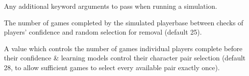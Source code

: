 \begin{description}[style=multiline,leftmargin=3cm]
  \item[kwargs] Any additional keyword arguments to pass when running a simulation.
  \item[boredom\\period] The number of games completed by the simulated
  playerbase between checks of players' confidence and random selection for
  removal (default 25).
  \item[initial\\exploration] A value which controls the number of
  games individual players complete before their confidence \& learning models control
  their character pair selection (default 28, to allow sufficient games to
  select every available pair exactly once).
\end{description}
  
